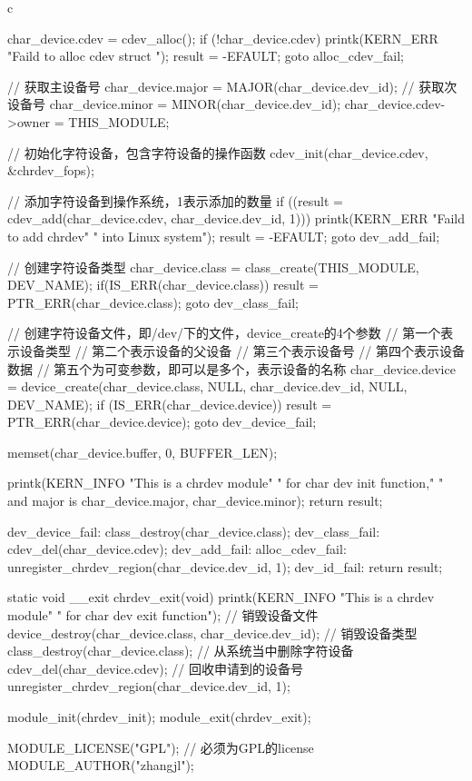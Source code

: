 \begin{code-block}{c}
{        char_device.cdev = cdev_alloc();
        if (!char_device.cdev) {
                printk(KERN_ERR "Faild to alloc cdev struct \n");
                result = -EFAULT;
                goto alloc_cdev_fail;
        }

        // 获取主设备号
        char_device.major = MAJOR(char_device.dev_id);
        // 获取次设备号
        char_device.minor = MINOR(char_device.dev_id);
        char_device.cdev->owner = THIS_MODULE;

        // 初始化字符设备，包含字符设备的操作函数
        cdev_init(char_device.cdev, &chrdev_fops);

        // 添加字符设备到操作系统，1表示添加的数量
        if ((result = cdev_add(char_device.cdev, char_device.dev_id, 1))) {
                printk(KERN_ERR "Faild to add chrdev"
                                " into Linux system\n");
                result = -EFAULT;
                goto dev_add_fail;
        }

        // 创建字符设备类型
        char_device.class = class_create(THIS_MODULE, DEV_NAME);
        if(IS_ERR(char_device.class)){
                result = PTR_ERR(char_device.class);
                goto dev_class_fail;
        }

        // 创建字符设备文件，即/dev/下的文件，device_create的4个参数
        // 第一个表示设备类型
        // 第二个表示设备的父设备
        // 第三个表示设备号
        // 第四个表示设备数据
        // 第五个为可变参数，即可以是多个，表示设备的名称
        char_device.device = device_create(char_device.class, NULL,
                char_device.dev_id, NULL, DEV_NAME);
        if (IS_ERR(char_device.device)) {
                result = PTR_ERR(char_device.device);
                goto dev_device_fail;
        }

        memset(char_device.buffer, 0, BUFFER_LEN);

        printk(KERN_INFO "This is a chrdev module"
                " for char dev init function,"
                " and major is %
                char_device.major, char_device.minor);
        return result;

dev_device_fail:
        class_destroy(char_device.class);
dev_class_fail:
        cdev_del(char_device.cdev);
dev_add_fail:
alloc_cdev_fail:
        unregister_chrdev_region(char_device.dev_id, 1);
dev_id_fail:
        return result;
}

static void __exit chrdev_exit(void)
{
        printk(KERN_INFO
                "This is a chrdev module"
                " for char dev exit function\n");
        // 销毁设备文件
        device_destroy(char_device.class, char_device.dev_id);
        // 销毁设备类型
        class_destroy(char_device.class);
        // 从系统当中删除字符设备
        cdev_del(char_device.cdev);
        // 回收申请到的设备号
        unregister_chrdev_region(char_device.dev_id, 1);
}

module_init(chrdev_init);
module_exit(chrdev_exit);

MODULE_LICENSE("GPL"); // 必须为GPL的license
MODULE_AUTHOR("zhangjl");
\end{code-block}


